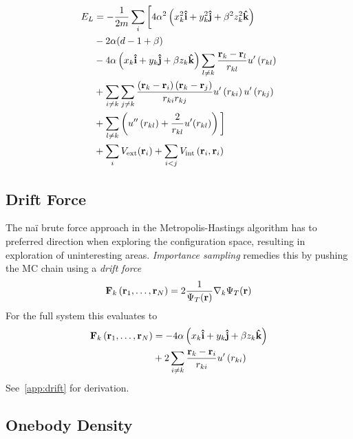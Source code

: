 \begin{align*}
  E_{L} &= -\frac{1}{2m}\sum_{i}\bigg[4\alpha^{2}\left(  x_{k}^{2}\uvec{i} + y_{k}^{2}\uvec{j} + \beta^{2} z_{k}^{2}\uvec{k}  \right)\\
        &-2\alpha(d-1+\beta)\\
        &- 4\alpha\left(  x_{k}\uvec{i} + y_{k}\uvec{j} + \beta z_{k}\uvec{k}  \right)
          \sum_{l\neq k} \frac{\vb{r}_{k}-\vb{r}_{l}}{r_{kl}}u^{\prime}\left( r_{kl} \right)\\
        &+ \sum_{i\neq k}\sum_{j\neq k}\frac{\left( \vb{r}_{k}-\vb{r}_{i} \right)\left( \vb{r}_{k} -\vb{r}_{j} \right)}{r_{ki}r_{kj}}u^{\prime}\left( r_{ki} \right)u^{\prime}\left( r_{kj} \right)\\
        &+ \sum_{l\neq k} \left( u^{\prime\prime}\left( r_{kl} \right)  + \frac{2}{r_{kl}}u^{\prime}(r_{kl})\right)\bigg]\\
        &+ \sum_{i}V_{\text{ext}}(\vb{r}_{i}) + \sum_{i<j}V_{\text{int}}\left( \vb{r}_{i}, \vb{r}_{i} \right)
\end{align*}





\subsection{Drift Force}

The na\"{i} brute force approach in the Metropolis-Hastings algorithm has to
preferred direction when exploring the configuration space, resulting in
exploration of uninteresting areas. \textit{Importance sampling} remedies this
by pushing the MC chain using a \textit{drift force}
\begin{align*}
  \vb{F}_{k}\left( \vb{r}_{1}, \ldots, \vb{r}_{N} \right) = 2 \frac{1}{\Psi_T(\vb{r})}\nabla_{k}\Psi_T(\vb{r})
\end{align*}
For the full system this evaluates to
\begin{align*}
  \vb{F}_{k}\left( \vb{r}_{1}, \ldots, \vb{r}_{N} \right) &= -4\alpha\left(  x_{k}\uvec{i} + y_{k}\uvec{j} + \beta z_{k}\uvec{k} \right)\\
  &+ 2\sum_{i\neq k} \frac{\vb{r}_{k} - \vb{r}_{i}}{r_{ki}}u^{\prime}\left( r_{ki} \right)
\end{align*}
See~\cref{app:drift} for derivation.

\subsection{Onebody Density}

